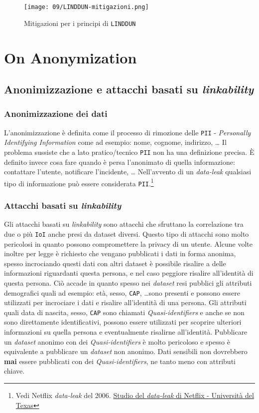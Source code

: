         \begin{figure}[H]
            \centering
            \texttt{[image: 09/LINDDUN-mitigazioni.png]}
            \caption{Mitigazioni per i principi di \texttt{LINDDUN}}
        \end{figure}
\section{On Anonymization}
    \subsection{Anonimizzazione e attacchi basati su \textit{linkability}} 
        \subsubsection{Anonimizzazione dei dati}
            L'anonimizzazione è definita come il processo di rimozione delle \texttt{PII} - \textit{Personally Identifying Information} come ad esempio: nome, cognome, indirizzo, \dots\newline
            Il problema sussiste che a lato pratico/tecnico \texttt{PII} non ha una definizione precisa. È definito invece cosa fare quando è persa l'anonimato di quella informazione: contattare l'utente, notificare l'incidente, \dots\newline
            Nell'avvento di un \textit{data-leak} qualsiasi tipo di informazione può essere considerata \texttt{PII}.\footnote{Vedi Netflix \textit{data-leak} del 2006. \href{https://www.cs.utexas.edu/~shmat/netflix-faq.html}{Studio del \textit{data-leak} di Netflix - Università del Texas}}
        \subsubsection{Attacchi basati su \textit{linkability}}
            Gli attacchi basati su \textit{linkability} sono attacchi che sfruttano la correlazione tra due o più \texttt{IoI} anche presi da dataset diversi. Questo tipo di attacchi sono molto pericolosi in quanto possono compromettere la privacy di un utente. Alcune volte inoltre per legge è richiesto che vengano pubblicati i dati in forma anonima, spesso incrociando questi dati con altri dataset è possibile risalire a delle informazioni riguardanti questa persona, e nel caso peggiore risalire all'identità di questa persona.\newline
            Ciò accade in quanto spesso nei \textit{dataset} resi pubblici gli attributi demografici quali ad esempio: età, sesso, \texttt{CAP}, \dots sono presenti e possono essere utilizzati per incrociare i dati e risalire all'identità di una persona. Gli attributi quali data di nascita, sesso, \texttt{CAP} sono chiamati \textit{Quasi-identifiers} e anche se non sono direttamente identificativi, possono essere utilizzati per scoprire ulteriori informazioni su quella persona e eventualmente risalirne all'identità. Pubblicare un \textit{dataset} anonimo con dei \textit{Quasi-identifiers} è molto pericoloso e spesso è equivalente a pubblicare un \textit{dataset} non anonimo. Dati sensibili non dovrebbero \textbf{mai} essere pubblicati con dei \textit{Quasi-identifiers}, ne tanto meno con attributi chiave.
